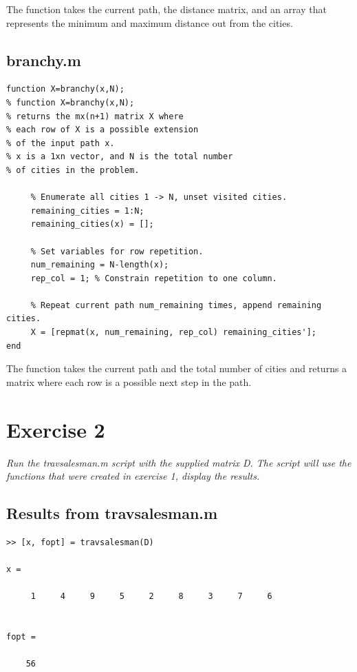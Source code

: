 \documentclass{article}
\begin{document}
  \noindent
  The function takes the current path, the distance matrix, and an array that
  represents the minimum and maximum distance out from the cities.

  \newpage

  \subsection*{branchy.m}

  \begin{lstlisting}
function X=branchy(x,N);
% function X=branchy(x,N);
% returns the mx(n+1) matrix X where
% each row of X is a possible extension
% of the input path x.
% x is a 1xn vector, and N is the total number
% of cities in the problem.

     % Enumerate all cities 1 -> N, unset visited cities.
     remaining_cities = 1:N;
     remaining_cities(x) = [];

     % Set variables for row repetition.
     num_remaining = N-length(x);
     rep_col = 1; % Constrain repetition to one column.

     % Repeat current path num_remaining times, append remaining cities.
     X = [repmat(x, num_remaining, rep_col) remaining_cities'];
end
  \end{lstlisting}

  \noindent
  The function takes the current path and the total number of cities and
  returns a matrix where each row is a possible next step in the path. \\

\section*{Exercise 2}

  \textit{Run the travsalesman.m script with the supplied matrix D. The script
  will use the functions that were created in exercise 1, display the results.}

  \subsection*{Results from travsalesman.m}

  \begin{lstlisting}
>> [x, fopt] = travsalesman(D)

x =

     1     4     9     5     2     8     3     7     6


fopt =

    56
  \end{lstlisting}
\end{document}
